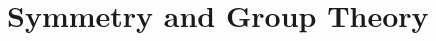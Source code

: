 \documentclass{Workshop}
\begin{document}
\frontmatter
\tableofcontents

\mainmatter
\chapter{Symmetry and Group Theory}


\backmatter
\printindex[keywords]
\end{document}

